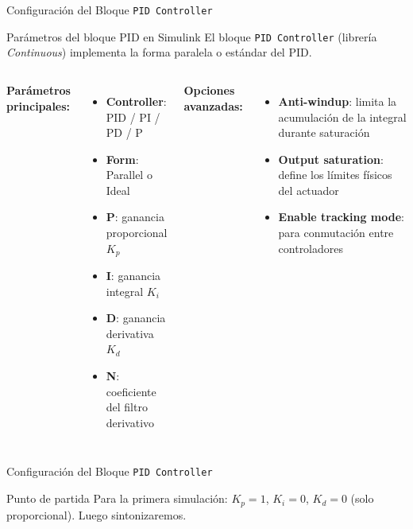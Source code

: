 \documentclass[aspectratio=169,xcolor=dvipsnames]{beamer}
\begin{document}
\begin{frame}{Configuración del Bloque \texttt{PID Controller}}
    \begin{block}{Parámetros del bloque PID en Simulink}
        El bloque \texttt{PID Controller} (librería \textit{Continuous}) implementa la forma paralela o estándar del PID.
    \end{block}
    \begin{columns}
        \textbf{Parámetros principales:}
        \begin{itemize}
            \item \textbf{Controller}: PID / PI / PD / P
            \item \textbf{Form}: Parallel o Ideal
            \item \textbf{P}: ganancia proporcional $K_p$
            \item \textbf{I}: ganancia integral $K_i$
            \item \textbf{D}: ganancia derivativa $K_d$
            \item \textbf{N}: coeficiente del filtro derivativo
        \end{itemize}
        \textbf{Opciones avanzadas:}
        \begin{itemize}
            \item \textbf{Anti-windup}: limita la acumulación de la integral durante saturación
            \item \textbf{Output saturation}: define los límites físicos del actuador
            \item \textbf{Enable tracking mode}: para conmutación entre controladores
        \end{itemize}
    \end{columns}
\end{frame}

\begin{frame}{Configuración del Bloque \texttt{PID Controller}}
    \begin{exampleblock}{Punto de partida}
        Para la primera simulación: $K_p = 1$, $K_i = 0$, $K_d = 0$ (solo proporcional). Luego sintonizaremos.
    \end{exampleblock}
\end{frame}
\end{document}
